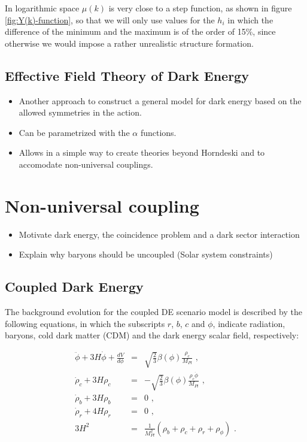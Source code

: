 In logarithmic space $\mu(k)$ is very close to a step function, as
shown in figure \ref{fig:Y(k)-function}, so that we will only use
values for the $h_{i}$ in which the difference of the minimum and
the maximum is of the order of 15\%, since otherwise we would impose
a rather unrealistic structure formation.


\subsection{Effective Field Theory of Dark Energy}
\begin{itemize}
\item Another approach to construct a general model for dark energy based
on the allowed symmetries in the action.
\item Can be parametrized with the $\alpha$ functions.
\item Allows in a simple way to create theories beyond Horndeski and to
accomodate non-universal couplings.
\end{itemize}

\section{Non-universal coupling}

\begin{itemize}
\item Motivate dark energy, the coincidence problem and a dark sector interaction
\item Explain why baryons should be uncoupled (Solar system constraints)
\end{itemize}

\subsection{Coupled Dark Energy \label{sub:CDE}}

The background evolution for the coupled DE scenario model is described
by the following equations, in which the subscripts $r$, $b$, $c$
and $\phi$, indicate radiation, baryons, cold dark matter (CDM) and
the dark energy scalar field, respectively:

\begin{eqnarray}
\ddot{\phi}+3H\dot{\phi}+\frac{dV}{d\phi} & = & \sqrt{\frac{2}{3}}\beta(\phi)\frac{\rho_{c}}{M_{Pl}}\,\,,\label{eq:quint-kleingordon}\\
\dot{\rho}_{c}+3H\rho_{c} & = & -\sqrt{\frac{2}{3}}\beta(\phi)\frac{\rho_{c}\dot{\phi}}{M_{Pl}}\,\,,\label{eq:cdm-back-density}\\
\dot{\rho}_{b}+3H\rho_{b} & = & 0\,\,,\\
\dot{\rho}_{r}+4H\rho_{r} & = & 0\,\,,\\
3H^{2} & = & \frac{1}{M_{Pl}^{2}}(\rho_{b}+\rho_{c}+\rho_{r}+\rho_{\phi})\,\,.
\end{eqnarray}


